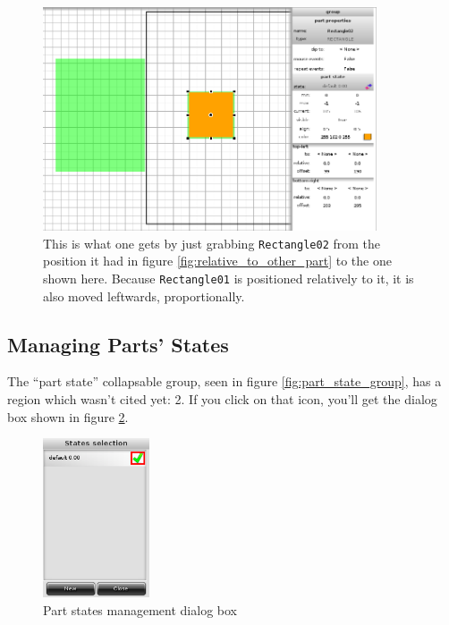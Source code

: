 \documentclass[a4paper]{profusion}
\begin{document}
\begin{figure}[h!]
  \centering
  \includegraphics[width=0.88\textwidth]{images/rel_drag.png}
  \caption{This is what one gets by just grabbing \texttt{Rectangle02}
    from the position it had in figure
    \ref{fig:relative_to_other_part} to the one shown here. Because
    \texttt{Rectangle01} is positioned relatively to it, it is also
    moved leftwards, proportionally.}
  \label{fig:rel_drag}
\end{figure}

\subsection{Managing Parts' States}

The ``part state'' collapsable group, seen in figure
\ref{fig:part_state_group}, has a region which wasn't cited yet: 2. If
you click on that icon, you'll get the dialog box shown in figure
\ref{fig:states_dialog}.

\begin{figure}[h!]
  \centering
  \includegraphics[width=0.28\textwidth]{images/states_box.png}
  \caption{Part states management dialog box}
  \label{fig:states_dialog}
\end{figure}
\end{document}
